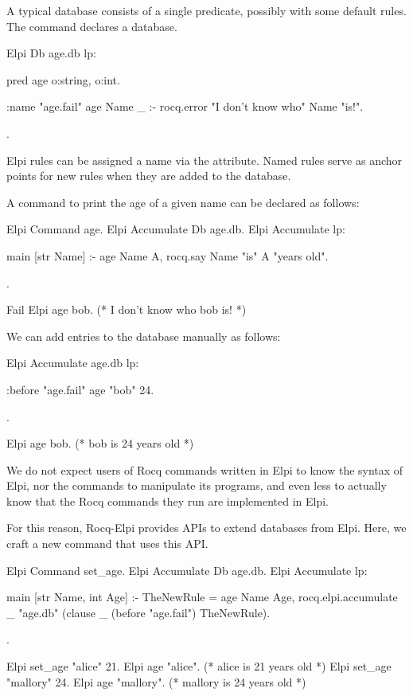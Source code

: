 \documentclass[a4paper, 11pt]{book}
\begin{document}
A typical database consists of a single predicate, possibly with some default
rules. The  command declares a database.

\begin{rocqcode}
Elpi Db age.db lp:{{
  pred age o:string, o:int.

  :name "age.fail"
  age Name _ :- rocq.error "I don't know who" Name "is!".
}}.
\end{rocqcode}


Elpi rules can be assigned a name via the  attribute. Named rules
serve as anchor points for new rules when they are added to the database.


A command to print the age of a given name can be declared as follows:

\begin{rocqcode}
Elpi Command age.
Elpi Accumulate Db age.db.
Elpi Accumulate lp:{{

  main [str Name] :-
    age Name A,
    rocq.say Name "is" A "years old".

}}.

Fail Elpi age bob. (* I don't know who bob is! *)
\end{rocqcode}


We can add entries to the database manually as follows:

\begin{rocqcode}
Elpi Accumulate age.db lp:{{

  :before "age.fail"     %
  age "bob" 24.

}}.

Elpi age bob. (* bob is 24 years old *)
\end{rocqcode}


We do not expect users of Rocq commands written in Elpi to know the syntax of
Elpi, nor the commands to manipulate its programs, and even less to actually
know that the Rocq commands they run are implemented in Elpi.


For this reason, Rocq-Elpi provides APIs to extend databases from Elpi. Here,
we craft a new command  that uses this API.

\begin{rocqcode}
Elpi Command set_age.
Elpi Accumulate Db age.db.
Elpi Accumulate lp:{{

  main [str Name, int Age] :-
    TheNewRule = age Name Age,
    rocq.elpi.accumulate _ "age.db"
      (clause _ (before "age.fail") TheNewRule).

}}.

Elpi set_age "alice" 21.
Elpi age "alice". (* alice is 21 years old *)
Elpi set_age "mallory" 24.
Elpi age "mallory". (* mallory is 24 years old *)
\end{rocqcode}
\end{document}
